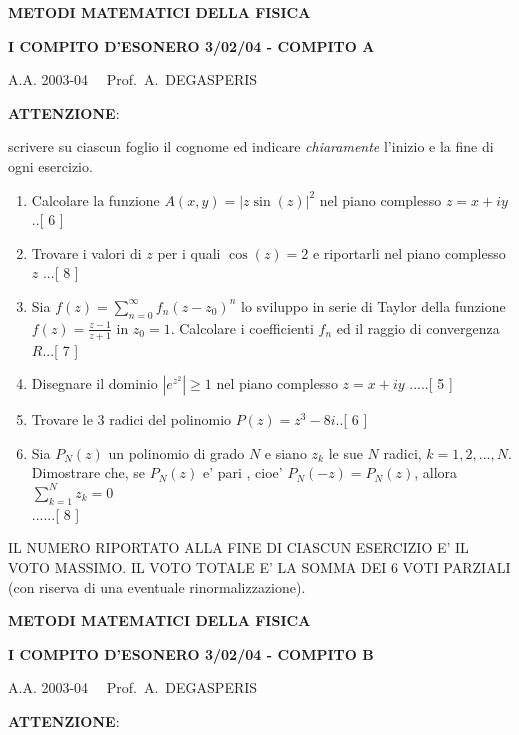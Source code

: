\documentclass[,12pt]{article}
\begin{document}
\newpage

\centerline{\bf{METODI MATEMATICI DELLA FISICA}}

\centerline{\bf{I COMPITO D'ESONERO 3/02/04 - COMPITO A}}

\centerline{A.A. 2003-04 \ \ Prof.\ A.\ DEGASPERIS}
\vspace{20pt}
\noindent
{\bf ATTENZIONE}:

\noindent
scrivere su ciascun foglio il cognome ed indicare
\emph{chiaramente} l'inizio e la fine di ogni esercizio.
\vspace{20pt}
\noindent
\begin{enumerate}
\item Calcolare la funzione
$A(x,y)=|z\sin(z)|^2$ nel piano
complesso
$z=x+iy$..[ 6 ] 
\item Trovare i valori di $z$
per i quali $\cos(z)=2$ e
riportarli nel piano complesso $z$ ...[ 8 ]
\item Sia $f(z)=\sum_{n=0}^\infty f_n(z-z_0)^n$ lo sviluppo in serie di
Taylor della funzione $f(z)=\frac{z-1}{z+1}$ in $z_0=1$. Calcolare i
coefficienti $f_n$ ed il raggio di convergenza $R$...[ 7 ]
\item Disegnare il dominio $|e^{z^2}| \geq 1$ nel piano complesso $z=x+iy$
.....[ 5 ] 
\item Trovare le 3 radici del polinomio
$P(z)=z^3-8i$..[ 6 ]
\item Sia $P_N(z)$ un polinomio di grado $N$ e siano $z_k$ le
sue $N$ radici, $k=1,2,...,N$. Dimostrare che, se $P_N(z)$ e' pari
, cioe' $P_N(-z)=P_N(z)$, allora $\sum_{k=1}^Nz_k =0$\\......[ 8 ]

\end{enumerate}

\noindent IL NUMERO RIPORTATO ALLA FINE DI CIASCUN ESERCIZIO
E' IL VOTO MASSIMO. IL VOTO TOTALE E' LA SOMMA DEI 6 VOTI
PARZIALI (con riserva di una eventuale rinormalizzazione).

\newpage

\centerline{\bf{METODI MATEMATICI DELLA FISICA}}

\centerline{\bf{I COMPITO D'ESONERO 3/02/04 - COMPITO B}}

\centerline{A.A. 2003-04 \ \ Prof.\ A.\ DEGASPERIS}
\vspace{20pt}
\noindent
{\bf ATTENZIONE}:
\end{document}
